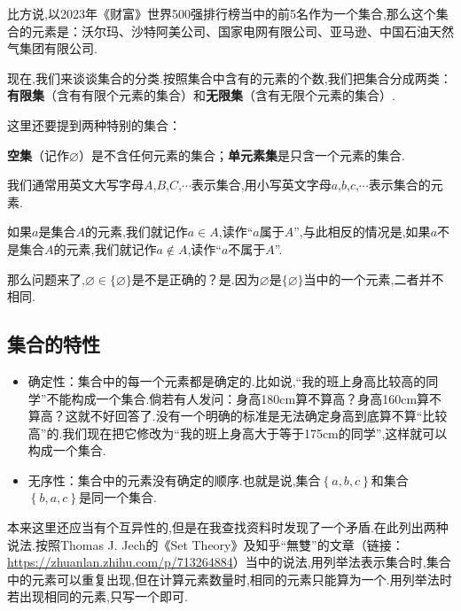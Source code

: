 \documentclass[lang=cn,math=cm,chinesefont=nofont,11pt,scheme=chinese,twocol]{elegantbook}
\begin{document}
比方说,以2023年《财富》世界500强排行榜当中的前5名作为一个集合,那么这个集合的元素是：沃尔玛、沙特阿美公司、国家电网有限公司、亚马逊、中国石油天然气集团有限公司.

\hspace*{\fill}

现在,我们来谈谈集合的分类.按照集合中含有的元素的个数,我们把集合分成两类：\textbf{有限集}（含有有限个元素的集合）和\textbf{无限集}（含有无限个元素的集合）.

这里还要提到两种特别的集合：

\textbf{空集}（记作$\varnothing$）是不含任何元素的集合；\textbf{单元素集}是只含一个元素的集合.

\hspace*{\fill}

我们通常用英文大写字母$A$,$B$,$C$,$\cdots$表示集合,用小写英文字母$a$,$b$,$c$,$\cdots$表示集合的元素.

如果$a$是集合$A$的元素,我们就记作$a\in A$,读作“$a$属于$A$”,与此相反的情况是,如果$a$不是集合$A$的元素,我们就记作$a\notin A$,读作“$a$不属于$A$”.

那么问题来了,$\varnothing \in \{\varnothing\}$是不是正确的？是.因为$\varnothing$是$\{\varnothing\}$当中的一个元素,二者并不相同.

\subsection{集合的特性}

\begin{itemize}
  \item 确定性：集合中的每一个元素都是确定的.比如说,“我的班上身高比较高的同学”不能构成一个集合.倘若有人发问：身高180cm算不算高？身高160cm算不算高？这就不好回答了.没有一个明确的标准是无法确定身高到底算不算“比较高”的.我们现在把它修改为“我的班上身高大于等于175cm的同学”,这样就可以构成一个集合.
  
  \item 无序性：集合中的元素没有确定的顺序.也就是说,集合$\left\{a,b,c \right\}$和集合$\left\{b,a,c \right\}$是同一个集合.
\end{itemize}

本来这里还应当有个互异性的,但是在我查找资料时发现了一个矛盾.在此列出两种说法.按照Thomas J. Jech的《Set Theory》及知乎“無雙”的文章（链接：\href{https://zhuanlan.zhihu.com/p/713264884}{https://zhuanlan.zhihu.com/p/713264884}）当中的说法,用列举法表示集合时,集合中的元素可以重复出现,但在计算元素数量时,相同的元素只能算为一个.用列举法时若出现相同的元素,只写一个即可.
\end{document}
